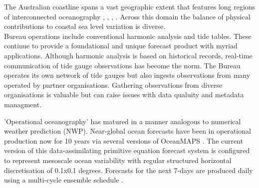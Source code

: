 The Australian coastline spans a vast geographic extent that features long regions of interconnected oceanography \cite{Ridgway:2004kb}, \cite{Church:1986tl}, \cite{Haigh:2013bn}, \cite{Woodham:2013cl}.  Across this domain the balance of physical contributions to coastal sea level variation is diverse.\\


Bureau operations include conventional harmonic analysis and tide tables.
These continue to provide a foundational and unique forecast product with myriad applications.
Although harmonic analysis is based on historical records, real-time communication of tide gauge observations has become the norm.
The Bureau operates its own network of tide gauges \cite{Greenslade:2012um} but also ingests observations from many operated by partner organisations.   
Gathering observations from diverse organisations is valuable but can raise issues with data qualuity and metadata managment.



'Operational oceanography' \cite{Bell:2009uv} has matured in a manner analogous to numerical weather prediction (NWP).
Near-global ocean forecasts have been in operational production now for 10 years via several versions of OceanMAPS  
\cite{Brassington:2007ut}\cite{NMOC:2007wq}\cite{BureauofMeterology:2011ta}\cite{Brassington:2012wm}.
The current version of this data-assimilating primitive equation forecast system is configured to represent mesoscale ocean variability with regular structured horizontal discretisation of 0.1x0.1 degrees.
Forecasts for the next 7-days are produced daily using a multi-cycle ensemble schedule \cite{GaryBBrassington:2013jw}.






